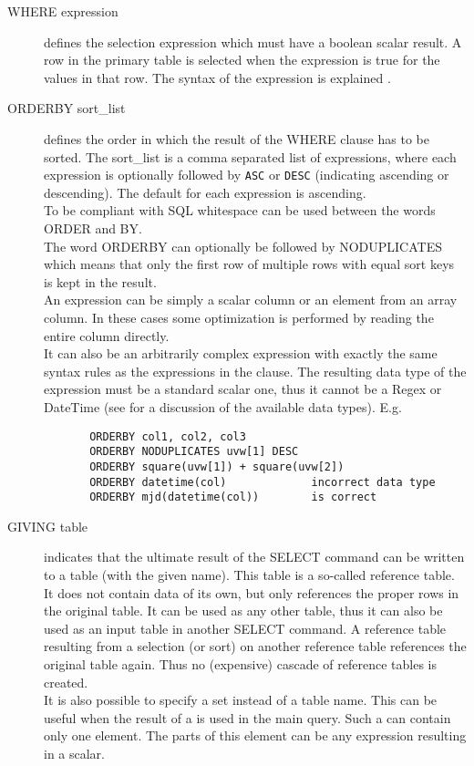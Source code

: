 \begin{description}
  \item[WHERE expression]
       defines the selection expression which must have a boolean
       scalar result. A row in the primary table
       is selected when the expression is true for the values in that row.
       The syntax of the expression is explained
       .
  \item[ORDERBY sort\_list]
       defines the order in which the result of the WHERE clause
       has to be sorted. The sort\_list is a comma separated list of
       expressions, where each expression is
       optionally followed by \texttt{ASC} or \texttt{DESC}
       (indicating ascending or descending). The default for each
       expression is ascending.
       \\To be compliant with SQL whitespace can be used between the
       words ORDER and BY.
       \\The word ORDERBY can optionally be followed by NODUPLICATES
       which means that only the first row of multiple rows with
       equal sort keys is kept in the result.
       \\An expression can be simply a scalar column or an element from
       an array column. In these cases some optimization is performed
       by reading the entire column directly.
       \\It can also be an arbitrarily complex expression
       with exactly the same syntax rules as the expressions in the
        clause.
       The resulting data type of the expression must
       be a standard scalar one, thus it cannot be a Regex or
       DateTime (see  for a discussion
       of the available data types).
       E.g.
       \begin{verbatim}
       ORDERBY col1, col2, col3
       ORDERBY NODUPLICATES uvw[1] DESC
       ORDERBY square(uvw[1]) + square(uvw[2])
       ORDERBY datetime(col)             incorrect data type
       ORDERBY mjd(datetime(col))        is correct
       \end{verbatim}
  \item[ \label{TAQL:GIVING}GIVING table ]
       indicates that the ultimate result of the SELECT command can be
       written to a table (with the given name). This table is a
       so-called reference table.
       It does not contain data of its own, but only references the
       proper rows in the original table. It can be used
       as any other table, thus it can also be used as an input table in
       another SELECT command. A reference table resulting from
       a selection (or sort) on another reference table references the
       original table again. Thus no (expensive) cascade of reference
       tables is created.
       \\It is also possible to specify a set instead of a table name.
       This can be useful when the result of a
        is used in the main query.
       Such a  can contain only one element.
       The parts of this element can be any expression resulting in a scalar.
\end{description}
